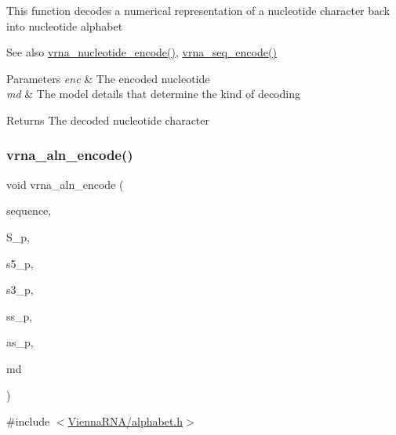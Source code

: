This function decodes a numerical representation of a nucleotide character back into nucleotide alphabet

\begin{DoxySeeAlso}{See also}
\mbox{\hyperlink{group__utils_gac12bf00123f88621c9be847b0879c1fb}{vrna\+\_\+nucleotide\+\_\+encode()}}, \mbox{\hyperlink{group__utils_ga636e7d6f888fd639587296a5eddea660}{vrna\+\_\+seq\+\_\+encode()}}
\end{DoxySeeAlso}

\begin{DoxyParams}{Parameters}
{\em enc} & The encoded nucleotide \\
\hline
{\em md} & The model details that determine the kind of decoding \\
\hline
\end{DoxyParams}
\begin{DoxyReturn}{Returns}
The decoded nucleotide character 
\end{DoxyReturn}
\mbox{\label{group__utils_ga56dfbd38023d289a3b5daf7fe06ab4d6}} 
\subsubsection{\texorpdfstring{vrna\+\_\+aln\+\_\+encode()}{vrna\_aln\_encode()}}
{\footnotesize\ttfamily void vrna\+\_\+aln\+\_\+encode (\begin{DoxyParamCaption}\item[{const char $\ast$}]{sequence,  }\item[{short $\ast$$\ast$}]{S\+\_\+p,  }\item[{short $\ast$$\ast$}]{s5\+\_\+p,  }\item[{short $\ast$$\ast$}]{s3\+\_\+p,  }\item[{char $\ast$$\ast$}]{ss\+\_\+p,  }\item[{unsigned int $\ast$$\ast$}]{as\+\_\+p,  }\item[{\mbox{\hyperlink{group__model__details_ga1f8a10e12a0a1915f2a4eff0b28ea17c}{vrna\+\_\+md\+\_\+t}} $\ast$}]{md }\end{DoxyParamCaption})}



{\ttfamily \#include $<$\mbox{\hyperlink{alphabet_8h}{Vienna\+R\+N\+A/alphabet.\+h}}$>$}

\mbox{\label{group__utils_ga629aeca7a1a5d148e2c7e0e5d12299cc}} 
